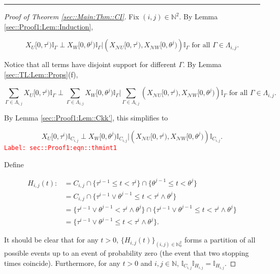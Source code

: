 \documentclass[12pt]{article}
\newcommand{\mb}{\mathbb}
\newcommand{\mc}{\mathcal}
\newcommand{\te}{\text}
\newcommand{\tr}{\textcolor{red}}
\newcommand{\labe}[1]{\tr{\texttt{Label: #1}}}
\newcommand{\lin}{\rule{\linewidth}{0.4 pt}}
\newcommand{\neigh}{\mc{N}}					%
\renewcommand{\U}{U}							%
\newcommand{\UU}{W}								%
\renewcommand{\t}{t}							%
\newcommand{\rt}[1]{\tau^{#1}}						%
\newcommand{\rtt}[1]{\theta^{#1}}					%
\newcommand{\itt}{i}								%
\newcommand{\ittt}{j}								%
\newcommand{\rxvts}[2]{X_{#1}{#2}}					%
\newcommand{\apath}{\Gamma}						%
\newcommand{\pathset}[2]{\Lambda_{#1,#2}}			%
\newcommand{\pathsete}[2]{C_{#1,#2}}			%
\newcommand{\pathseted}[2]{H_{#1,#2}}			%
\begin{document}
\lin

\begin{proof}[Proof of Theorem \ref{sec::Main:Thm::CI}]

Fix \((\itt,\ittt) \in \mb{N}^2\). By Lemma \ref{sec::Proof1:Lem::Induction}, 

\[\rxvts{\U}{[0,\rt{\itt})}\mb{I}_{\apath}\perp \rxvts{\UU}{[0,\rtt{\ittt})}\mb{I}_{\apath}\big|\left(\rxvts{\neigh{\U}}{[0,\rt{\itt})},\rxvts{\neigh{\UU}}{[0,\rtt{\ittt})}\right)\mb{I}_{\apath}\te{ for all }\apath \in \pathset{\itt}{\ittt}.\]

Notice that all terms have disjoint support for different \(\apath\). By Lemma \ref{sec::TL:Lem::Props}(f), 

\[\sum_{\apath\in\pathset{\itt}{\ittt}}\rxvts{\U}{[0,\rt{\itt})}\mb{I}_{\apath}\perp \sum_{\apath\in\pathset{\itt}{\ittt}}\rxvts{\UU}{[0,\rtt{\ittt})}\mb{I}_{\apath}\bigg|\sum_{\apath\in\pathset{\itt}{\ittt}}\left(\rxvts{\neigh{\U}}{[0,\rt{\itt})},\rxvts{\neigh{\UU}}{[0,\rtt{\ittt})}\right)\mb{I}_{\apath}\te{ for all }\apath \in \pathset{\itt}{\ittt}.\]

By Lemma \ref{sec::Proof1:Lem::Ckk'}, this simplifies to 

\begin{equation}
\rxvts{\U}{[0,\rt{\itt})}\mb{I}_{\pathsete{\itt}{\ittt}}\perp \rxvts{\UU}{[0,\rtt{\ittt})}\mb{I}_{\pathsete{\itt}{\ittt}}\big|\left(\rxvts{\neigh{\U}}{[0,\rt{\itt})},\rxvts{\neigh{\UU}}{[0,\rtt{\ittt})}\right)\mb{I}_{\pathsete{\itt}{\ittt}}.
\label{sec::Proof1:eqn::thmint1}
\end{equation}
\labe{sec::Proof1:eqn::thmint1}

Define

\begin{align*}
\pathseted{\itt}{\ittt}(\t) :&= \pathsete{\itt}{\ittt}\cap \{\rt{\itt-1}\leq \t < \rt{\itt}\}\cap \{\rtt{\ittt-1} \leq \t < \rtt{\ittt}\}\\
&=\pathsete{\itt}{\ittt}\cap\{\rt{\itt-1}\vee\rtt{\ittt-1} \leq \t < \rt{\itt}\wedge \rtt{\ittt}\}\\
&=\{\rt{\itt-1}\vee\rtt{\ittt-1}  < \rt{\itt}\wedge \rtt{\ittt}\} \cap \{\rt{\itt-1}\vee\rtt{\ittt-1} \leq \t < \rt{\itt}\wedge \rtt{\ittt}\}\\
&= \{\rt{\itt-1}\vee\rtt{\ittt-1} \leq \t < \rt{\itt}\wedge \rtt{\ittt}\}.
\end{align*}

It should be clear that for any \(\t > 0\), \(\{\pathseted{\itt}{\ittt}(\t)\}_{(\itt,\ittt)\in\mb{N}_0^2}\) forms a partition of all possible events up to an event of probability zero (the event that two stopping times coincide). Furthermore, for any \(t > 0\) and \(\itt,\ittt\in \mb{N}\), \(\mb{I}_{\pathsete{\itt}{\ittt}}\mb{I}_{\pathseted{\itt}{\ittt}} = \mb{I}_{\pathseted{\itt}{\ittt}}\).


\end{proof}
\end{document}
